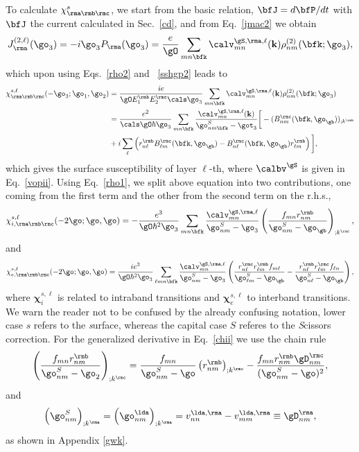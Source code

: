 \documentclass[floatfix,prb,aps,superscriptaddress,11pt,preprint,letterpaper]{revtex4}
\begin{document}
To calculate $\chi_{\rma\rmb\rmc}^s$,
we start from the basic relation, $\bfJ=d\bfP/dt$ 
with $\bfJ$ the current calculated in Sec.~\ref{cd}, and
from Eq.~\eqref{jmac2} we obtain
\begin{equation}\label{Pjikn}
J_{\rma}^{(2,\ell)}(\go_3)=-i\go_3P_{\rma}(\go_3)
=\frac{e}{\gO}
\sum_{mn\bfk}
\calv^{\gS,\rma,\ell}_{mn}(\mathbf{k})
\rho^{(2)}_{nm}(\bfk;\go_3)
,
\end{equation}
which upon using Eqs.~\eqref{rho2} and ~\eqref{sshgp2} leads to
\begin{align}\label{Pjikn2}
\chi^{s,\ell}_{\rma\rmb\rmc}(-\go_3;\go_1,\go_2)
&=
\frac{ie}{\gO E^{\rmb}_1E^{\rmc}_2\cals \go_3}
\sum_{mn\bfk}
\calv^{\gS,\rma,\ell}_{mn}(\mathbf{k})
\rho^{(2)}_{nm}(\bfk;\go_3)
\nonumber \\
&=
\frac{e^2}{\cals\gO\hbar\go_3}
\sum_{mn\bfk}
\frac{\calv^{\gS,\rma,\ell}_{mn}(\mathbf{k})}
{\go^S_{nm\bfk}-\got_3}
\bigg[
-(B_{nm}^{\rmc}(\bfk,\go_\gb))_{;k^{\rmb}}
\nonumber \\
&
+i\sum_\ell\left(r_{n\ell}^{\rmb}B_{\ell m}^{\rmc}(\bfk,\go_\gb) -
  B_{n\ell}^{\rmc}(\bfk,\go_\gb) 
  r_{\ell m}^{\rmb}\right)
\bigg]
,
\end{align}
which gives the surface susceptibility of layer $\ell$-th, where 
$\calbv^\gS$ is given in Eq.~\eqref{vopii}.
Using Eq.~\eqref{rho1}, we
split above equation into
two contributions, one coming from the first term and the other
from the second term on the r.h.s.,
\begin{equation}\label{chii}
\chi_{i,\rma\rmb\rmc}^{s,\ell}
(-2\go;\go,\go)
=-\frac{e^3}{\gO\hbar^2\go_3}\sum_{mn\bfk}
\frac{\calv_{mn}^{\gS,\rma,\ell}}{\go^S_{nm}-\go_3}
\left(\frac{f_{mn}r_{nm}^{\rmb}}{\go^S_{nm}-\go_\gb}\right)_{;k^{\rmc}},
\end{equation} 
and
\begin{equation}\label{chie}
\chi_{e,\rma\rmb\rmc}^{s,\ell}
(-2\go;\go,\go)
=\frac{ie^3}{\gO\hbar^2\go_3}\sum_{\ell mn\bfk}
\frac{\calv_{mn}^{\gS,\rma,\ell}}{\go^S_{nm}-\go_3}
\left(
\frac{r_{n\ell}^{\rmc} r_{\ell m}^{\rmb} 
f_{m\ell}}{\go^S_{\ell m}-\go_\gb}
-\frac{r_{n\ell}^{\rmb} r_{\ell m}^{\rmc} 
f_{\ell n}}{\go^S_{n \ell}-\go_\gb}
\right),
\end{equation} 
where $\boldsymbol{\chi}^{s,\ell}_i$
 is related to intraband transitions and
$\boldsymbol{\chi}^{s,\ell}_e$
to interband transitions. We warn the reader not to be confused by the
already confusing notation, lower case $s$ refers to the 
{\it s}urface, whereas the capital case $S$ referes to the {\it S}cissors correction.   
For the generalized derivative in Eq.~\eqref{chii} we use the chain rule 
\begin{equation}\label{gene2}
\left(\frac{f_{mn}r_{nm}^{\rmb}}{\go^S_{nm}-\go_2}\right)_{;k^{\rmc}}=
\frac{f_{mn}}{\go^S_{nm}-\go}\left(r_{nm}^\rmb\right)_{;k^{\rmc}}
-\frac{f_{mn}r_{nm}^{\rmb}\gD_{nm}^\rmc}{(\go^S_{nm}-\go)^2}
,
\end{equation}
and 
\begin{align}\label{eli.13}
\left(\go^S_{nm}\right)_{;k^{\rma}}
=
\left(\go^\lda_{nm}\right)_{;k^{\rma}}
= 
v_{nn}^{\lda,\rma}-v_{mm}^{\lda,\rma}\equiv\gD_{nm}^{\rma}
,
\end{align} 
as shown in Appendix \ref{gwk}. 
\end{document}
